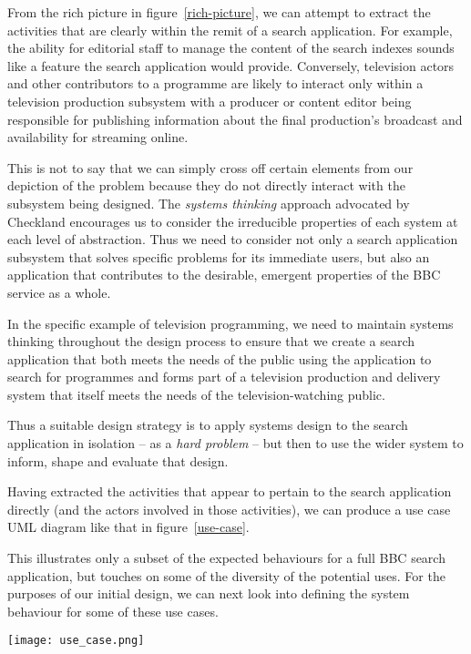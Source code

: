 \documentclass[a4paper]{report}
\begin{document}
From the rich picture in figure~\ref{rich-picture}, we can attempt to
extract the activities that are clearly within the remit of a search
application. For example, the ability for editorial staff to manage
the content of the search indexes sounds like a feature the search
application would provide. Conversely, television actors and other
contributors to a programme are likely to interact only within a television
production subsystem with a producer or content editor being responsible
for publishing information about the final production's broadcast and
availability for streaming online.

This is not to say that we can simply cross off certain elements from
our depiction of the problem because they do not directly interact
with the subsystem being designed. The \emph{systems thinking} approach
advocated by Checkland \cite{checkland1999systems} encourages us to
consider the irreducible properties of each system at each level
of abstraction. Thus we need to consider not only a search application
subsystem that solves specific problems for its immediate users, but
also an application that contributes to the desirable, emergent
properties of the BBC service as a whole.

In the specific example of television programming, we need to maintain
systems thinking throughout the design process to ensure that we
create a search application that both meets the needs of the public
using the application to search for programmes and forms part of
a television production and delivery system that itself meets the
needs of the television-watching public.

Thus a suitable design strategy is to apply systems design to
the search application in isolation -- as a \emph{hard problem} --
but then to use the wider system to inform, shape and evaluate that design.

Having extracted the activities that appear to pertain to the
search application directly (and the actors involved in those activities),
we can produce a use case UML diagram like that in figure~\ref{use-case}.

This illustrates only a subset of the expected behaviours for a full
BBC search application, but touches on some of the diversity of the
potential uses. For the purposes of our initial design, we can next look
into defining the system behaviour for some of these use cases.

\begin{sidewaysfigure}
  \begin{center}
    \texttt{[image: use\_case.png]}
  \end{center}
  \caption{Use case diagram for BBC Search application\label{use-case}}
\end{sidewaysfigure}
\end{document}
